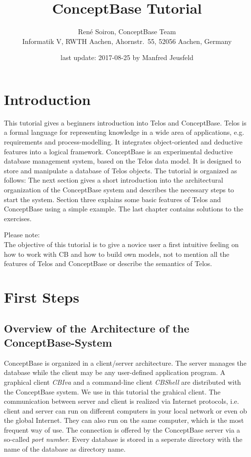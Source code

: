 \documentclass[10pt,a4paper]{article}
\author{
Ren{\'e} Soiron, ConceptBase Team\\
{\small Informatik V, RWTH Aachen, Ahornstr.\ 55, 52056 Aachen, Germany} }
\title{\bf ConceptBase Tutorial}
\date{last update: 2017-08-25 by Manfred Jeusfeld}
\begin{document}
\maketitle

\section{Introduction}

This tutorial gives a beginners introduction into Telos and ConceptBase.
Telos is a formal language for representing knowledge in a wide
area of applications, e.g. requirements and process-modelling.
It integrates object-oriented and deductive features into a
logical framework.
ConceptBase is an experimental deductive database management
system, based on the Telos data model. It is designed to store and
manipulate a database of Telos objects.
The tutorial is organized as follows:
The next section gives a short introduction into the architectural
organization of the ConceptBase system and describes the
necessary steps to start the system.
Section three explains some basic features of Telos and ConceptBase
using a simple example.
The last chapter contains solutions to the exercises.


Please note:\\
The objective of this tutorial is to give a novice user a first intuitive
feeling on how to work with CB and how to build own models, not
to mention all the features of Telos and ConceptBase or describe
the semantics of Telos.


\section{ First Steps}


\subsection{Overview of the Architecture of the ConceptBase-System}

ConceptBase is organized in a client/server architecture. The server
manages the database while the client may be any user-defined
application program. A graphical client {\em CBIva} and a command-line
client {\em CBShell} are
distributed with the ConceptBase system. We use in this tutorial the
grahical client.
The communication between server and client is realized via Internet protocols,
i.e. client and server can run on different computers in your local network
or even ob the global Internet. They can also run on the same computer, which
is the most frequent way of use.
The connection is offered by the ConceptBase server via a so-called {\em port number}.
Every database is stored in a seperate directory with the name of
the database as directory name.
\end{document}
